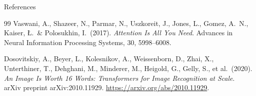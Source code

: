 \begin{frame}[allowframebreaks=0.88]{References}
\begin{thebibliography}{99}
  Vaswani, A., Shazeer, N., Parmar, N., Uszkoreit, J., Jones, L., Gomez,
  A.~N., Kaiser, {\L}.\ \& Polosukhin, I.\ (2017).
  \textit{Attention Is All You Need}.
  Advances in Neural Information Processing Systems, 30, 5998--6008.

  Dosovitskiy, A., Beyer, L., Kolesnikov, A., Weissenborn, D., Zhai, X.,
  Unterthiner, T., Dehghani, M., Minderer, M., Heigold, G., Gelly, S., et al.\
  (2020).
  \textit{An Image Is Worth 16 Words: Transformers for Image
  Recognition at Scale}.
  arXiv preprint arXiv:2010.11929.
  \url{https://arxiv.org/abs/2010.11929}.

  \end{thebibliography}
\end{frame}
